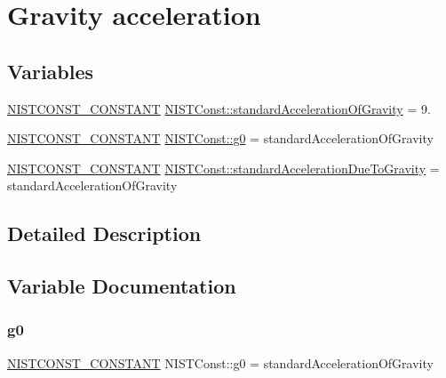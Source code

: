 \hypertarget{group___n_i_s_t_const-_gravity_acceleration}{}\section{Gravity acceleration}
\label{group___n_i_s_t_const-_gravity_acceleration}
\subsection*{Variables}
\begin{DoxyCompactItemize}
\item 
\mbox{\hyperlink{group___n_i_s_t_const-_macros_ga2b0fc1d7452373f816175dd86ce26729}{N\+I\+S\+T\+C\+O\+N\+S\+T\+\_\+\+C\+O\+N\+S\+T\+A\+NT}} \mbox{\hyperlink{group___n_i_s_t_const-_gravity_acceleration_ga22b6c6320ba235b01a0c0a1b3f9fd043}{N\+I\+S\+T\+Const\+::standard\+Acceleration\+Of\+Gravity}} = 9.
\item 
\mbox{\hyperlink{group___n_i_s_t_const-_macros_ga2b0fc1d7452373f816175dd86ce26729}{N\+I\+S\+T\+C\+O\+N\+S\+T\+\_\+\+C\+O\+N\+S\+T\+A\+NT}} \mbox{\hyperlink{group___n_i_s_t_const-_gravity_acceleration_ga0fa4739f4febc9e3cf11addc9ecf32dc}{N\+I\+S\+T\+Const\+::g0}} = standard\+Acceleration\+Of\+Gravity
\item 
\mbox{\hyperlink{group___n_i_s_t_const-_macros_ga2b0fc1d7452373f816175dd86ce26729}{N\+I\+S\+T\+C\+O\+N\+S\+T\+\_\+\+C\+O\+N\+S\+T\+A\+NT}} \mbox{\hyperlink{group___n_i_s_t_const-_gravity_acceleration_ga33716b656e3985cab5dad9e932201279}{N\+I\+S\+T\+Const\+::standard\+Acceleration\+Due\+To\+Gravity}} = standard\+Acceleration\+Of\+Gravity
\end{DoxyCompactItemize}


\subsection{Detailed Description}


\subsection{Variable Documentation}
\mbox{\label{group___n_i_s_t_const-_gravity_acceleration_ga0fa4739f4febc9e3cf11addc9ecf32dc}} 
\subsubsection{\texorpdfstring{g0}{g0}}
{\footnotesize\ttfamily \mbox{\hyperlink{group___n_i_s_t_const-_macros_ga2b0fc1d7452373f816175dd86ce26729}{N\+I\+S\+T\+C\+O\+N\+S\+T\+\_\+\+C\+O\+N\+S\+T\+A\+NT}} N\+I\+S\+T\+Const\+::g0 = standard\+Acceleration\+Of\+Gravity}


